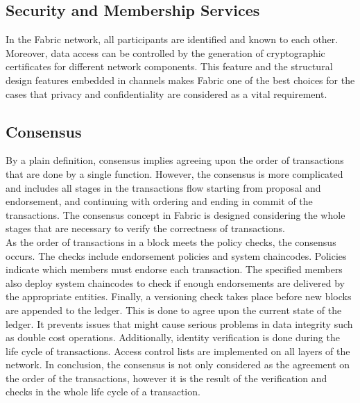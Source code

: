 \documentclass[sigconf,natbib=false]{acmart}
\begin{document}
    \subsection{Security and Membership Services}
    In the Fabric network, all participants are identified and known to each other. Moreover, data access can be controlled by the generation of cryptographic certificates for different network components. This feature and the structural design features embedded in channels makes Fabric one of the best choices for the cases that privacy and confidentiality are considered as a vital requirement.\cite{FabricModel}
    \subsection{Consensus}
    By a plain definition, consensus implies agreeing upon the order of transactions that are done by a single function. However, the consensus is more complicated and includes all stages in the transactions flow starting from proposal and endorsement, and continuing with ordering and ending in commit of the transactions. The consensus concept in Fabric is designed considering the whole stages that are necessary to verify the correctness of transactions.\\
    As the order of transactions in a block meets the policy checks, the consensus occurs. The checks include endorsement policies and system chaincodes. Policies indicate which members must endorse each transaction. The specified members also deploy system chaincodes to check if enough endorsements are delivered by the appropriate entities. Finally, a versioning check takes place before new blocks are appended to the ledger. This is done to agree upon the current state of the ledger. It prevents issues that might cause serious problems in data integrity such as double cost operations.
    Additionally, identity verification is done during the life cycle of transactions. Access control lists are implemented on all layers of the network. In conclusion, the consensus is not only considered as the agreement on the order of the transactions, however it is the result of the verification and checks in the whole life cycle of a transaction.\cite{FabricModel}
\end{document}
